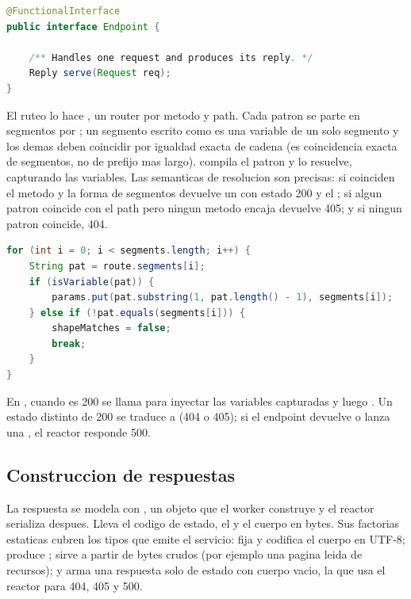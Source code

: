 \begin{lstlisting}[language=Java,caption={Contrato de un manejador de peticiones (net/Endpoint.java)}]
@FunctionalInterface
public interface Endpoint {

    /** Handles one request and produces its reply. */
    Reply serve(Request req);
}
\end{lstlisting}

El ruteo lo hace , un router por metodo y path. Cada patron se parte en
segmentos por \codigo{/}; un segmento escrito como  es una variable de
un solo segmento y los demas deben coincidir por igualdad exacta de cadena (es coincidencia
exacta de segmentos, no de prefijo mas largo). 
compila el patron y  lo resuelve, capturando las variables.
Las semanticas de resolucion son precisas: si coinciden el metodo y la forma de segmentos
devuelve un  con estado 200 y el ; si algun patron coincide
con el path pero ningun metodo encaja devuelve 405; y si ningun patron coincide, 404.

\begin{lstlisting}[language=Java,caption={Coincidencia de segmentos y captura de variables (net/Routes.java)}]
for (int i = 0; i < segments.length; i++) {
    String pat = route.segments[i];
    if (isVariable(pat)) {
        params.put(pat.substring(1, pat.length() - 1), segments[i]);
    } else if (!pat.equals(segments[i])) {
        shapeMatches = false;
        break;
    }
}
\end{lstlisting}

En , cuando  es 200 se llama
 para inyectar las variables capturadas y
luego . Un estado distinto de 200 se traduce a
 (404 o 405); si el endpoint devuelve  o
lanza una , el reactor responde 500.

\subsection{Construccion de respuestas}

La respuesta se modela con , un objeto que el worker construye y
el reactor serializa despues. Lleva el codigo de estado, el  y el
cuerpo en bytes. Sus factorias estaticas cubren los tipos que emite el servicio:
 fija  y
codifica el cuerpo en UTF-8;  produce ;
 sirve  a partir de bytes crudos (por ejemplo
una pagina leida de recursos); y  arma una respuesta solo de
estado con cuerpo vacio, la que usa el reactor para 404, 405 y 500.

